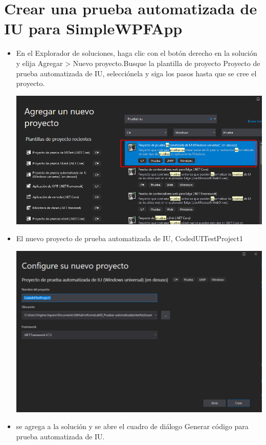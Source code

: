 \section{Crear una prueba automatizada de IU para SimpleWPFApp} 
\begin{itemize}
\item En el Explorador de soluciones, haga clic con el botón derecho en la solución y
elija Agregar > Nuevo proyecto.Busque la plantilla de proyecto Proyecto de prueba automatizada de IU, selecciónela y siga los pasos
hasta que se cree el proyecto.
\begin{center}
\includegraphics[width=\columnwidth]{images/6}\newline
\end{center}
 \item El nuevo proyecto de prueba automatizada de IU, CodedUITestProject1
\begin{center}
\includegraphics[width=\columnwidth]{images/7}\newline
\end{center}
\item se agrega a la solución y se abre el cuadro de diálogo Generar código para prueba automatizada de IU.

\end{itemize}
